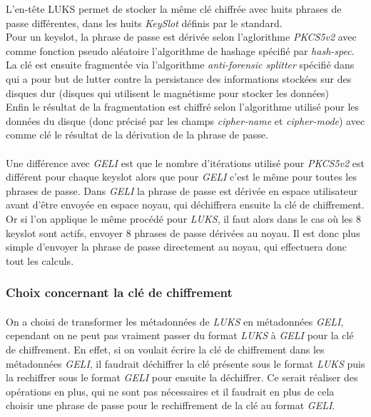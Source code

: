 L'en-tête LUKS permet de stocker la même clé chiffrée avec huits phrases de passe
différentes, dans les huits {\em KeySlot} définis par le standard.
\\
Pour un keyslot, la phrase de passe est dérivée selon l'aglorithme {\em PKCS5v2}
avec comme fonction pseudo aléatoire l'algorithme de hashage spécifié par 
{\em hash-spec}. La clé est ensuite fragmentée via l'algorithme 
{\em anti-forensic splitter} spécifié dans \cite{AFsplitting} qui a pour but de
lutter contre la persistance des informations stockées sur des disques dur
(disques qui utilisent le magnétisme pour stocker les données)
\\
Enfin le résultat de la fragmentation est chiffré selon l'algorithme utilisé 
pour les données du disque (donc précisé par les champs {\em cipher-name} et 
{\em cipher-mode}) avec comme clé le résultat de la dérivation de la phrase de
passe.

\paragraph{}
Une différence avec {\em GELI} est que le nombre d'itérations utilisé pour 
{\em PKCS5v2} est différent pour chaque keyslot alors que pour {\em GELI} c'est
le même pour toutes les phrases de passe.
Dans {\em GELI} la phrase de passe est dérivée en espace utilisateur avant 
d'être envoyée en espace noyau, qui déchiffrera ensuite la clé de chiffrement.
Or si l'on applique le même procédé pour {\em LUKS}, il faut alors dans le cas
où les 8 keyslot sont actifs, envoyer 8 phrases de passe dérivées au noyau.
Il est donc plus simple d'envoyer la phrase de passe directement au noyau, qui
effectuera donc tout les calculs.

\subsubsection{Choix concernant la clé de chiffrement}
\paragraph{}
On a choisi de transformer les métadonnées de {\em LUKS} en métadonnées 
{\em GELI}, cependant on ne peut pas vraiment passer du format {\em LUKS} à 
{\em GELI} pour la clé de chiffrement. En effet, si on voulait écrire la clé 
de chiffrement dans les métadonnées {\em GELI}, il faudrait déchiffrer la clé 
présente sous le format {\em LUKS} puis la rechiffrer sous le format {\em GELI}
pour ensuite la déchiffrer. Ce serait réaliser des opérations en plus, qui ne 
sont pas nécessaires et il faudrait en plus de cela choisir une phrase de passe
pour le rechiffrement de la clé au format {\em GELI}. 

